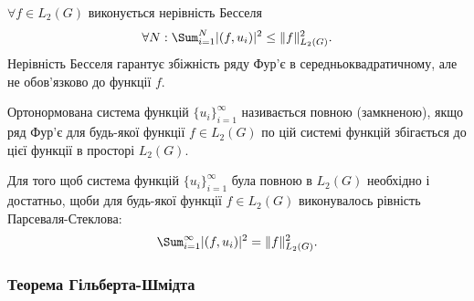 $\forall f \in L_2(G)$ виконується нерівність Бесселя
\begin{equation}
	\label{eq:4.7}
	\forall N: \Sum_{i = 1}^N |(f, u_i)|^2 \le \|f\|_{L_2(G)}^2.
\end{equation}
Нерівність Бесселя гарантує збіжність ряду Фур'є в середньоквадратичному, але не обов'язково до функції $f$.

\begin{definition}
	Ортонормована система функцій $\{ u_i \}_{i = 1}^\infty$ називається повною (замкненою), якщо ряд Фур'є для будь-якої функції $f \in L_2(G)$ по цій системі функцій збігається до цієї функції в просторі $L_2(G)$.
\end{definition}
\begin{theorem}
	Для того щоб система функцій $\{ u_i \}_{i = 1}^\infty$ була повною в $L_2(G)$ необхідно і достатньо, щоби для будь-якої функції $f \in L_2(G)$ виконувалось рівність Парсеваля-Стеклова:
	\begin{equation}
		\label{eq:4.8}
		\Sum_{i = 1}^\infty |(f, u_i)|^2 = \|f\|_{L_2(G)}^2.
	\end{equation}
\end{theorem}

\subsubsection{Теорема Гільберта-Шмідта}


